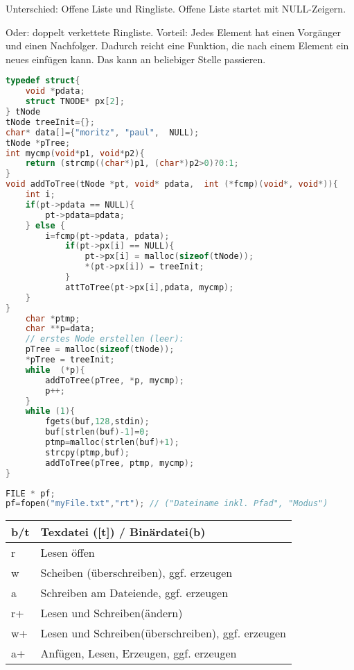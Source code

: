 \begin{multicols*}{3}
Unterschied: Offene Liste und Ringliste. Offene Liste startet mit NULL-Zeigern.

Oder: doppelt verkettete Ringliste. Vorteil: Jedes Element hat einen Vorgänger und einen Nachfolger. Dadurch reicht eine Funktion, die nach einem Element ein neues einfügen kann. Das kann an beliebiger Stelle passieren.

\begin{lstlisting}[language=C]
typedef struct{
	void *pdata;
	struct TNODE* px[2];
} tNode
tNode treeInit={};
char* data[]={"moritz", "paul",  NULL);
tNode *pTree;
int mycmp(void*p1, void*p2){
	return (strcmp((char*)p1, (char*)p2>0)?0:1;
}
void addToTree(tNode *pt, void* pdata,  int (*fcmp)(void*, void*)){
	int i;
	if(pt->pdata == NULL){
		pt->pdata=pdata;
	} else {
		i=fcmp(pt->pdata, pdata);
			if(pt->px[i] == NULL){
				pt->px[i] = malloc(sizeof(tNode));
				*(pt->px[i]) = treeInit;
			}
			attToTree(pt->px[i],pdata, mycmp);
	}
}
	char *ptmp;
	char **p=data;
	// erstes Node erstellen (leer):
	pTree = malloc(sizeof(tNode));
	*pTree = treeInit;
	while  (*p){
		addToTree(pTree, *p, mycmp); 
		p++;
	}
	while (1){
		fgets(buf,128,stdin);
		buf[strlen(buf)-1]=0;
		ptmp=malloc(strlen(buf)+1);
		strcpy(ptmp,buf);
		addToTree(pTree, ptmp, mycmp);
}
\end{lstlisting}

\HRule[4pt]
\begin{lstlisting}[language=C]
FILE * pf;
pf=fopen("myFile.txt","rt"); // ("Dateiname inkl. Pfad", "Modus")
\end{lstlisting}
\begin{tabular}{l | l}
b/t& Texdatei ([t]) / Binärdatei(b)\\
\hline 
r&Lesen öffen\\
w&Scheiben (überschreiben), ggf. erzeugen\\
a&Schreiben am Dateiende, ggf. erzeugen\\
r+&Lesen und Schreiben(ändern)\\
w+&Lesen und Schreiben(überschreiben), ggf. erzeugen\\
a+&Anfügen, Lesen, Erzeugen, ggf. erzeugen\\
\end{tabular}



\end{multicols*}
